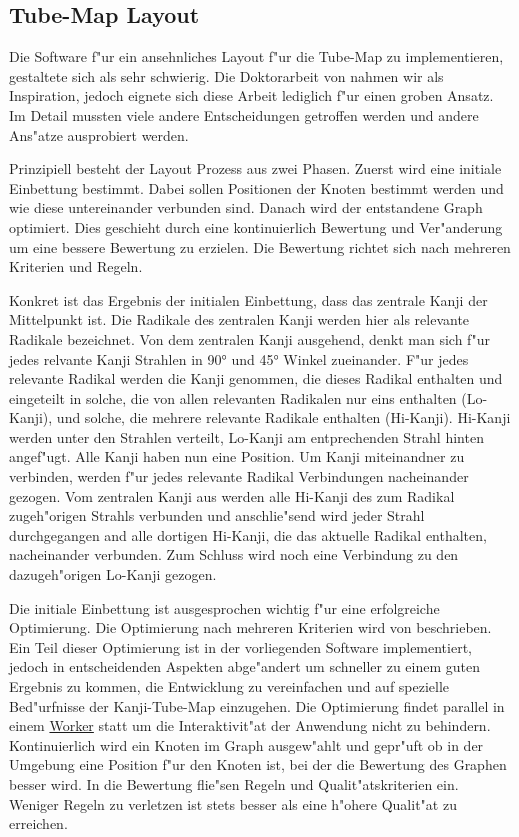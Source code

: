 \subsection{Tube-Map Layout}

Die Software f"ur ein ansehnliches Layout f"ur die Tube-Map zu
implementieren, gestaltete sich als sehr schwierig. Die Doktorarbeit von
\cite{automaticlayoutmetro08} nahmen wir als Inspiration, jedoch eignete
sich diese Arbeit lediglich f"ur einen groben Ansatz. Im Detail mussten
viele andere Entscheidungen getroffen werden und andere Ans"atze
ausprobiert werden.

Prinzipiell besteht der Layout Prozess aus zwei Phasen. Zuerst wird eine
initiale Einbettung bestimmt. Dabei sollen Positionen der Knoten
bestimmt werden und wie diese untereinander verbunden sind. Danach wird
der entstandene Graph optimiert. Dies geschieht durch eine
kontinuierlich Bewertung und Ver"anderung um eine bessere Bewertung zu
erzielen. Die Bewertung richtet sich nach mehreren Kriterien und Regeln.

Konkret ist das Ergebnis der initialen Einbettung, dass das zentrale
Kanji der Mittelpunkt ist. Die Radikale des zentralen Kanji werden hier als
relevante Radikale bezeichnet. Von dem zentralen Kanji ausgehend, denkt
man sich f"ur jedes relvante Kanji Strahlen in 90° und 45° Winkel
zueinander. F"ur jedes relevante Radikal werden die Kanji genommen, die
dieses Radikal enthalten und eingeteilt in solche, die von allen
relevanten Radikalen nur eins enthalten (Lo-Kanji), und solche, die
mehrere relevante Radikale enthalten (Hi-Kanji). Hi-Kanji werden unter
den Strahlen verteilt, Lo-Kanji am entprechenden Strahl hinten
angef"ugt. Alle Kanji haben nun eine Position. Um Kanji miteinandner
zu verbinden, werden f"ur jedes relevante
Radikal Verbindungen nacheinander gezogen. Vom zentralen Kanji aus werden alle Hi-Kanji des zum Radikal
zugeh"origen Strahls verbunden und anschlie"send wird jeder Strahl
durchgegangen and alle dortigen Hi-Kanji, die das aktuelle Radikal
enthalten, nacheinander verbunden. Zum Schluss wird noch eine Verbindung
zu den dazugeh"origen Lo-Kanji gezogen.

Die initiale Einbettung ist ausgesprochen wichtig f"ur eine erfolgreiche
Optimierung. Die Optimierung nach mehreren Kriterien wird von
\cite{automaticmetromap11} beschrieben. Ein Teil dieser Optimierung ist
in der vorliegenden Software implementiert, jedoch in entscheidenden
Aspekten abge"andert um schneller zu einem guten Ergebnis zu kommen, die
Entwicklung zu vereinfachen und auf spezielle Bed"urfnisse der
Kanji-Tube-Map einzugehen. Die Optimierung findet parallel in einem
\href{http://www.whatwg.org/specthes/web-apps/current-work/multipage/workers.html}{Worker}
statt um die Interaktivit"at der Anwendung nicht zu behindern.
Kontinuierlich wird ein Knoten im Graph ausgew"ahlt und gepr"uft ob in der
Umgebung eine Position f"ur den Knoten ist, bei der die Bewertung des
Graphen besser wird. In die Bewertung flie"sen Regeln und
Qualit"atskriterien ein. Weniger Regeln zu verletzen ist stets besser als
eine h"ohere Qualit"at zu erreichen.

